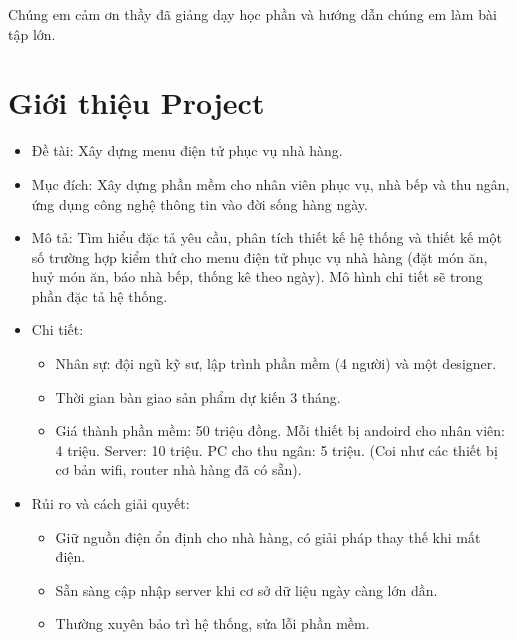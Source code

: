 \documentclass[a4paper,12pt]{report}
\begin{document}
Chúng em cảm ơn thầy đã giảng dạy học phần và hướng dẫn chúng em làm bài tập lớn.

\chapter{Giới thiệu Project}
\begin{itemize}
\item Đề tài: Xây dựng menu điện tử phục vụ nhà hàng. 
\item Mục đích: Xây dựng phần mềm cho nhân viên phục vụ, nhà bếp và thu ngân, ứng dụng công nghệ thông tin vào đời sống hàng ngày.
\item Mô tả: Tìm	hiểu đặc	tả yêu	cầu,	phân	tích	thiết kế hệ thống	và	thiết	kế một	số
trường	hợp	kiểm	thử cho menu	điện	tử phục	vụ nhà	hàng (đặt	món	ăn,	huỷ món	
ăn,	báo	nhà	bếp,	thống	kê	theo	ngày). Mô hình chi tiết sẽ trong phần đặc tả hệ thống.
\item Chi tiết:
\begin{itemize}
       \item Nhân sự: đội ngũ kỹ sư, lập trình phần mềm (4 người) và một designer.
       \item Thời gian bàn giao sản phẩm dự kiến 3 tháng.
       \item Giá thành phần mềm: 50 triệu đồng. Mỗi thiết bị andoird cho nhân viên: 4 triệu. Server: 10 triệu. PC cho thu ngân: 5 triệu. (Coi như các thiết bị cơ bản wifi, router nhà hàng đã có sẵn).
      \end{itemize}
\item Rủi ro và cách giải quyết:
\begin{itemize}
        \item{Giữ nguồn điện ổn định cho nhà hàng, có giải pháp thay thế khi mất điện.}
        \item{Sẵn sàng cập nhập server khi cơ sở dữ liệu ngày càng lớn dần.}
        \item{Thường xuyên bảo trì hệ thống, sửa lỗi phần mềm.}
      \end{itemize}
\end{itemize}
\end{document}
